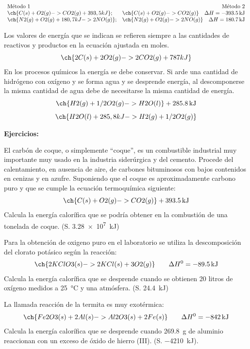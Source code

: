 \documentclass[
  spanish,
]{article}
\begin{document}
\[\begin{array}{lr}
    \text{Método 1}                               & \text{Método 2} \\
    \ch{C (s) + O2 (g) -> CO2 (g) + 393,5 kJ};    & \ch{C (s) + O2 (g) -> CO2 (g)} \quad \Delta H = \qty{-393,5}{\kJ} \\
    \ch{N2 (g) + O2 (g) + 180,7 kJ -> 2 NO (g)};  & \ch{N2 (g) + O2 (g) -> 2 NO (g)} \quad \Delta H = \qty{+180,7}{\kJ}
\end{array}\]

Los valores de energía que se indican se refieren siempre a las
cantidades de reactivos y productos en la ecuación ajustada en moles.
\[\ch{2 C(s) + 2 O2 (g) -> 2 CO2 (g) + 787 kJ}\] En los procesos
químicos la energía se debe conservar. Si arde una cantidad de hidrógeno
con oxígeno y se forma agua y se desprende energía, al descomponerse la
misma cantidad de agua debe de necesitarse la misma cantidad de energía.
\[\ch{H2 (g) + 1/2 O2 (g) -> H2O (l)} + \qty{285,8}{\kJ}\]
\[\ch{H2O (l) + 285,8 kJ -> H2 (g) + 1/2 O2 (g)}\]

\textbf{Ejercicios:}

\begin{exercise}El carbón de coque, o simplemente ``coque'', es un
combustible industrial muy importante muy usado en la industria
siderúrgica y del cemento. Procede del calentamiento, en ausencia de
aire, de carbones bituminosos con bajos contenidos en cenizas y en
azufre. Suponiendo que el coque es aproximadamente carbono puro y que se
cumple la ecuación termoquímica siguiente:
\[\ch{C (s) + O2 (g) -> CO2 (g)} + \qty{393,5}{\kJ}\] Calcula la energía
calorífica que se podría obtener en la combustión de una tonelada de
coque. (S. \qty{3,28e7}{\kJ})\end{exercise}

\begin{exercise}Para la obtención de oxigeno puro en el laboratorio se
utiliza la descomposición del clorato potásico según la reacción:
\[\ch{2 KClO3 (s) -> 2 KCl (s) + 3 O2 (g)} \qquad \Delta H^{0} = \qty{-89,5}{\kJ}\]
Calcula la energía calorífica que se desprende cuando se obtienen 20
litros de oxígeno medidos a \qty{25}{\degreeCelsius} y una atmósfera.
(S. \qty{24,4}{\kJ})\end{exercise}

\begin{exercise}La llamada reacción de la termita es muy exotérmica:
\[\ch{Fe2O3 (s) + 2 Al (s) -> Al2O3(s) + 2Fe(s)} \qquad \Delta H^{0} = \qty{-842}{\kJ}\]
Calcula la energía calorífica que se desprende cuando \qty{269,8}{\g} de
aluminio reaccionan con un exceso de óxido de hierro (III). (S.
\qty{-4210}{\kJ}).\end{exercise}
\end{document}
